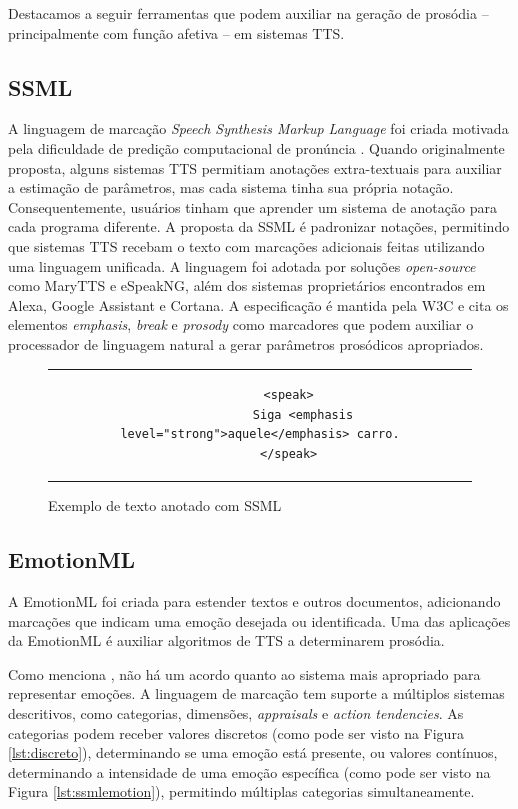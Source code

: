 Destacamos a seguir ferramentas que podem auxiliar na geração de prosódia --
principalmente com função afetiva -- em sistemas TTS.

\subsection{SSML}
A linguagem de marcação \emph{Speech Synthesis Markup Language} foi criada
motivada pela dificuldade de predição computacional de pronúncia
\cite{ssmlpaper}. Quando originalmente proposta, alguns sistemas TTS
permitiam anotações extra-textuais para auxiliar a estimação de parâmetros, mas
cada sistema tinha sua própria notação. Consequentemente, usuários tinham que
aprender um sistema de anotação para cada programa diferente. A proposta da SSML
é padronizar notações, permitindo que sistemas TTS recebam o texto com marcações
adicionais feitas utilizando uma linguagem unificada. A linguagem foi adotada
por soluções \emph{open-source} como MaryTTS e eSpeakNG, além dos sistemas
proprietários encontrados em Alexa, Google Assistant e Cortana. A especificação
é mantida pela W3C \cite{ssml} e cita os elementos \emph{emphasis}, \emph{break}
e \emph{prosody} como marcadores que podem auxiliar o processador de linguagem
natural a gerar parâmetros prosódicos apropriados.

\begin{figure}[thp]
    \centering
    \begin{tabular}{c}
        \begin{lstlisting}
        <speak>
            Siga <emphasis level="strong">aquele</emphasis> carro.
        </speak>
        \end{lstlisting}
    \end{tabular}
    \caption{Exemplo de texto anotado com SSML}
\end{figure}

\subsection{EmotionML}
A EmotionML \cite{emotionml} foi criada para estender textos e outros
documentos, adicionando marcações que indicam uma emoção desejada ou
identificada. Uma das aplicações da EmotionML é auxiliar algoritmos de TTS a
determinarem prosódia.

Como menciona , não há um acordo quanto ao sistema mais
apropriado para representar emoções. A linguagem de marcação tem suporte a
múltiplos sistemas descritivos, como categorias, dimensões, \emph{appraisals} e \emph{action tendencies}. As categorias podem receber valores discretos (como pode ser
visto na Figura \ref{lst:discreto}), determinando se uma emoção está presente, ou
valores contínuos, determinando a intensidade de uma emoção específica (como
pode ser visto na Figura \ref{lst:ssmlemotion}), permitindo múltiplas categorias
simultaneamente.

